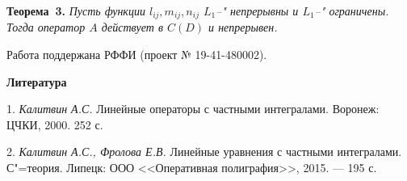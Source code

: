 \textbf{Теорема~3.}
{\it Пусть функции $l_{ij},m_{ij},n_{ij}$ $L_1$--" непрерывны и $L_1$--" ограничены.
Тогда оператор $A$ действует в $C(D)$ и непрерывен.}

Работа поддержана РФФИ (проект № 19-41-480002).


\smallskip \centerline {\bf Литература} \nopagebreak

1. {\it Калитвин А.С.} Линейные операторы с частными интегралами. Воронеж: ЦЧКИ, 2000. 252 с.

2. {\it Калитвин А.С., Фролова Е.В.} Линейные уравнения с частными интегралами. С"=теория. Липецк: ООО <<Оперативная полиграфия>>, 2015. — 195 с.
